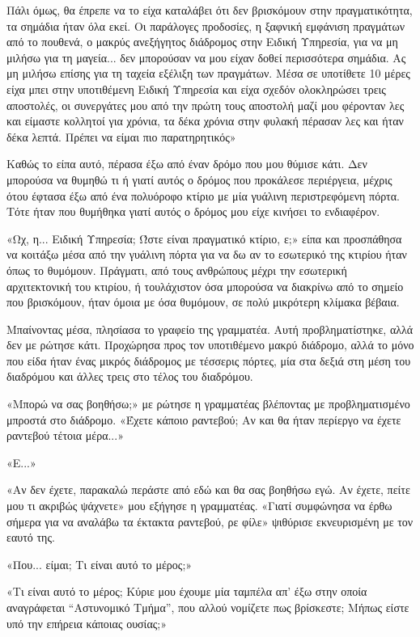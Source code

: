 \documentclass[12pt,twoside, openany]{book}
\begin{document}
Πάλι όμως, θα έπρεπε να το είχα καταλάβει ότι δεν βρισκόμουν στην πραγματικότητα, τα σημάδια ήταν όλα εκεί. Οι παράλογες προδοσίες, η ξαφνική εμφάνιση πραγμάτων από το πουθενά, ο μακρύς ανεξήγητος διάδρομος στην Ειδική Υπηρεσία, για να μη μιλήσω για τη μαγεία... δεν μπορούσαν να μου είχαν δοθεί περισσότερα σημάδια. Ας μη μιλήσω επίσης για τη ταχεία εξέλιξη των πραγμάτων. Μέσα σε υποτίθετε 10 μέρες είχα μπει στην υποτιθέμενη Ειδική Υπηρεσία και είχα σχεδόν ολοκληρώσει τρεις αποστολές, οι συνεργάτες μου από την πρώτη τους αποστολή μαζί μου φέρονταν λες και είμαστε κολλητοί για χρόνια, τα δέκα χρόνια στην φυλακή πέρασαν λες και ήταν δέκα λεπτά. Πρέπει να είμαι πιο παρατηρητικός»

Καθώς το είπα αυτό, πέρασα έξω από έναν δρόμο που μου θύμισε κάτι. Δεν μπορούσα να θυμηθώ τι ή γιατί αυτός ο δρόμος που προκάλεσε περιέργεια, μέχρις ότου έφτασα έξω από ένα πολυόροφο κτίριο με μία γυάλινη περιστρεφόμενη πόρτα. Τότε ήταν που θυμήθηκα γιατί αυτός ο δρόμος μου είχε κινήσει το ενδιαφέρον.

«Ωχ, η... Ειδική Υπηρεσία; Ώστε είναι πραγματικό κτίριο, ε;» είπα και προσπάθησα να κοιτάξω μέσα από την γυάλινη πόρτα για να δω αν το εσωτερικό της κτιρίου ήταν όπως το θυμόμουν. Πράγματι, από τους ανθρώπους μέχρι την εσωτερική αρχιτεκτονική του κτιρίου, ή τουλάχιστον όσα μπορούσα να διακρίνω από το σημείο που βρισκόμουν, ήταν όμοια με όσα θυμόμουν, σε πολύ μικρότερη κλίμακα βέβαια.

Μπαίνοντας μέσα, πλησίασα το γραφείο της γραμματέα. Αυτή προβληματίστηκε, αλλά δεν με ρώτησε κάτι. Προχώρησα προς τον υποτιθέμενο μακρύ διάδρομο, αλλά το μόνο που είδα ήταν ένας μικρός διάδρομος με τέσσερις πόρτες, μία στα δεξιά στη μέση του διαδρόμου και άλλες τρεις στο τέλος του διαδρόμου.

«Μπορώ να σας βοηθήσω;» με ρώτησε η γραμματέας βλέποντας με προβληματισμένο μπροστά στο διάδρομο. «Έχετε κάποιο ραντεβού; Αν και θα ήταν περίεργο να έχετε ραντεβού τέτοια μέρα...»

«Ε...»

«Αν δεν έχετε, παρακαλώ περάστε από εδώ και θα σας βοηθήσω εγώ. Αν έχετε, πείτε μου τι ακριβώς ψάχνετε» μου εξήγησε η γραμματέας. «Γιατί συμφώνησα να έρθω σήμερα για να αναλάβω τα έκτακτα ραντεβού, ρε φίλε» ψιθύρισε εκνευρισμένη με τον εαυτό της.

«Που... είμαι; Τι είναι αυτό το μέρος;»

«Τι είναι αυτό το μέρος; Κύριε μου έχουμε μία ταμπέλα απ’ έξω στην οποία αναγράφεται “Αστυνομικό Τμήμα”, που αλλού νομίζετε πως βρίσκεστε; Μήπως είστε υπό την επήρεια κάποιας ουσίας;»
\end{document}

